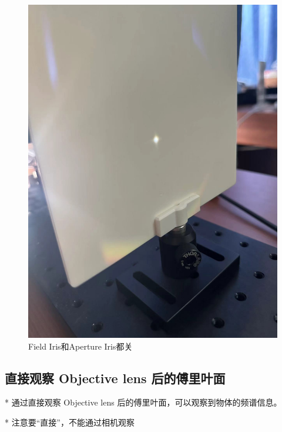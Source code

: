 \documentclass{ctexart}
\begin{document}
\begin{figure}[H]
\begin{minipage}[b]{0.2\textwidth}
    \includegraphics[width=\textwidth]{pictures/微信图片_20241010201025.jpg}
    \caption{Field Iris和Aperture Iris都关}
  \end{minipage}
\end{figure}
\subsection{直接观察 Objective lens 后的傅里叶面}
* 通过直接观察 Objective lens 后的傅里叶面，可以观察到物体的频谱信息。

* 注意要“直接”，不能通过相机观察
\end{document}

